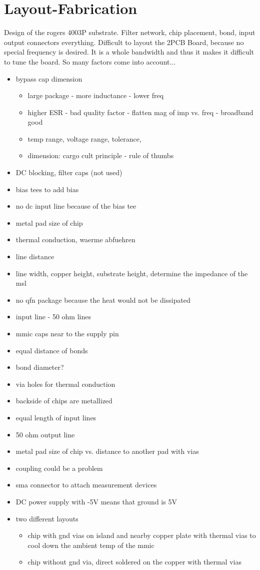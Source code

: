 \chapter{Layout-Fabrication}
Design of the rogers 4003P substrate. Filter network, chip placement, bond, input output connectors everything. Difficult to layout the 2PCB Board, because no special frequency is desired. It is a whole bandwidth and thus it makes it difficult to tune the board. So many factors come into account... 
\begin{itemize}
	\item bypass cap dimension
	\begin{itemize}
		\item large package - more inductance - lower freq
		\item higher ESR - bad quality factor - flatten mag of imp vs. freq - broadband good
		\item temp range, voltage range, tolerance, 
		\item dimension: cargo cult principle - rule of thumbs
	\end{itemize}
	\item DC blocking, filter caps (not used) 
	\item bias tees to add bias 
	\item no dc input line because of the bias tee
	\item metal pad size of chip
	\item thermal conduction, waerme abfuehren
	\item line distance
	\item line width, copper height, substrate height, determine the impedance of the msl
	\item no qfn package because the heat would not be dissipated
	\item input line - 50 ohm lines
	\item mmic caps near to the supply pin
	\item equal distance of bonds
	\item bond diameter?
	\item via holes for thermal conduction
	\item backside of chips are metallized
	\item equal length of input lines
	\item 50 ohm output line
	\item metal pad size of chip vs. distance to another pad with vias
	\item coupling could be a problem
	\item sma connector to attach measurement devices
	\item DC power supply with -5V means that ground is 5V
	\item two different layouts
	\begin{itemize}
		\item chip with gnd vias on island and nearby copper plate with thermal vias to cool down the ambient temp of the mmic
		\item chip without gnd via, direct soldered on the copper with thermal vias
	\end{itemize}
\end{itemize}